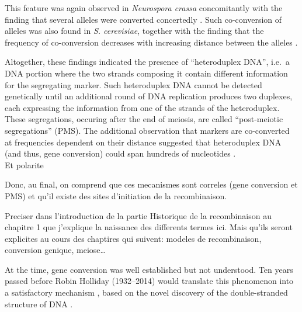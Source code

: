 This feature was again observed in \textit{Neurospora crassa} concomitantly with the finding that several alleles were converted concertedly \citep{case1964allelic}. 
Such co-conversion of alleles was also found in \textit{S. cerevisiae}, together with the finding that the frequency of co-conversion decreases with increasing distance between the alleles \citep[\cite{fogel1969informational}, reviewed by][]{orr1985fungal}. 


Altogether, these findings indicated the presence of “heteroduplex DNA”, i.e.\ a DNA portion where the two strands composing it contain different information for the segregating marker.
Such heteroduplex DNA cannot be detected genetically until an additional round of DNA replication produces two duplexes, each expressing the information from one of the strands of the heteroduplex.
These segregations, occuring after the end of meiosis, are called “post-meiotic segregations” (PMS).
The additional observation that markers are co-converted at frequencies dependent on their distance suggested that heteroduplex DNA (and thus, gene conversion) could span hundreds of nucleotides \citep{orr1985fungal}.\\






Et polarite



Donc, au final, on comprend que ces mecanismes sont correles (gene conversion et PMS) et qu'il existe des sites d'initiation de la recombinaison. 

Preciser dans l'introduction de la partie Historique de la recombinaison au chapitre 1 que j'explique la naissance des differents termes ici. Mais qu'ils seront explicites au cours des chaptires qui suivent: modeles de recombinaison, conversion genique, meiose…



At the time, gene conversion was well established but not understood. Ten years passed before Robin Holliday (1932--2014) would translate this phenomenon into a satisfactory mechanism \citep{holliday1964mechanism}, based on the novel discovery of the double-stranded structure of DNA \citep{franklin1953molecular,watson1953molecular}. 






